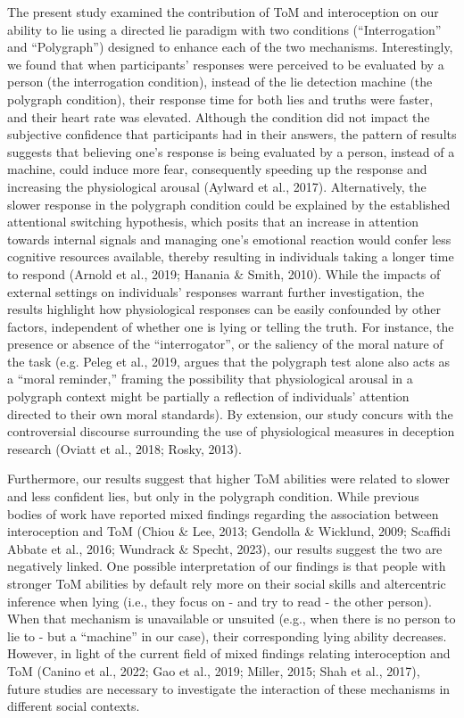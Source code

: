 \documentclass[
  man,mask,floatsintext]{apa6}
\begin{document}
The present study examined the contribution of ToM and interoception on our ability to lie using a directed lie paradigm with two conditions (``Interrogation'' and ``Polygraph'') designed to enhance each of the two mechanisms. Interestingly, we found that when participants' responses were perceived to be evaluated by a person (the interrogation condition), instead of the lie detection machine (the polygraph condition), their response time for both lies and truths were faster, and their heart rate was elevated. Although the condition did not impact the subjective confidence that participants had in their answers, the pattern of results suggests that believing one's response is being evaluated by a person, instead of a machine, could induce more fear, consequently speeding up the response and increasing the physiological arousal (Aylward et al., 2017). Alternatively, the slower response in the polygraph condition could be explained by the established attentional switching hypothesis, which posits that an increase in attention towards internal signals and managing one's emotional reaction would confer less cognitive resources available, thereby resulting in individuals taking a longer time to respond (Arnold et al., 2019; Hanania \& Smith, 2010). While the impacts of external settings on individuals' responses warrant further investigation, the results highlight how physiological responses can be easily confounded by other factors, independent of whether one is lying or telling the truth. For instance, the presence or absence of the ``interrogator'', or the saliency of the moral nature of the task (e.g. Peleg et al., 2019, argues that the polygraph test alone also acts as a ``moral reminder,'' framing the possibility that physiological arousal in a polygraph context might be partially a reflection of individuals' attention directed to their own moral standards). By extension, our study concurs with the controversial discourse surrounding the use of physiological measures in deception research (Oviatt et al., 2018; Rosky, 2013).

Furthermore, our results suggest that higher ToM abilities were related to slower and less confident lies, but only in the polygraph condition. While previous bodies of work have reported mixed findings regarding the association between interoception and ToM (Chiou \& Lee, 2013; Gendolla \& Wicklund, 2009; Scaffidi Abbate et al., 2016; Wundrack \& Specht, 2023), our results suggest the two are negatively linked. One possible interpretation of our findings is that people with stronger ToM abilities by default rely more on their social skills and altercentric inference when lying (i.e., they focus on - and try to read - the other person). When that mechanism is unavailable or unsuited (e.g., when there is no person to lie to - but a ``machine'' in our case), their corresponding lying ability decreases. However, in light of the current field of mixed findings relating interoception and ToM (Canino et al., 2022; Gao et al., 2019; Miller, 2015; Shah et al., 2017), future studies are necessary to investigate the interaction of these mechanisms in different social contexts.
\end{document}
